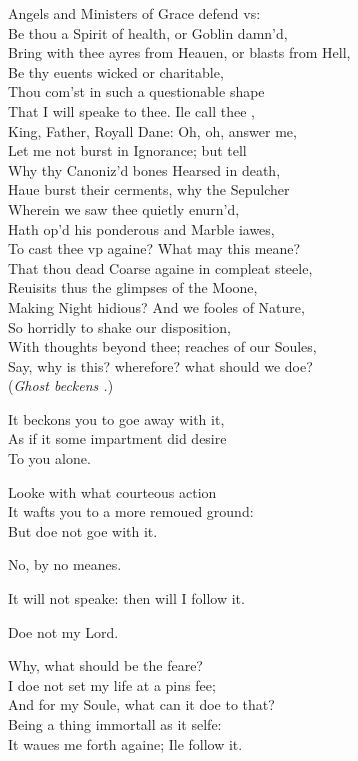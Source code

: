 \documentclass[a5paper,DIV=calc,11pt]{scrbook}
\begin{document}
\begin{drama*}
    \hamspeaks Angels and Ministers of Grace defend vs:\\
    Be thou a Spirit of health, or Goblin damn'd,\\
    Bring with thee ayres from Heauen, or blasts from Hell,\\
    Be thy euents wicked or charitable,\\
    Thou com'st in such a questionable shape\\
    That I will speake to thee. Ile call thee \ham,\\
    King, Father, Royall Dane: Oh, oh, answer me,\\
    Let me not burst in Ignorance; but tell\\
    Why thy Canoniz'd bones Hearsed in death,\\
    Haue burst their cerments, why the Sepulcher\\
    Wherein we saw thee quietly enurn'd,\\
    Hath op'd his ponderous and Marble iawes,\\
    To cast thee vp againe? What may this meane?\\
    That thou dead Coarse againe in compleat steele,\\
    Reuisits thus the glimpses of the Moone,\\
    Making Night hidious? And we fooles of Nature,\\
    So horridly to shake our disposition,\\
    With thoughts beyond thee; reaches of our Soules,\\
    Say, why is this? wherefore? what should we doe?\\
    (\textit{Ghost beckens \ham.})
    
    \horspeaks It beckons you to goe away with it,\\
    As if it some impartment did desire\\
    To you alone.
    
    \marspeaks Looke with what courteous action\\
    It wafts you to a more remoued ground:\\
    But doe not goe with it.
    
    \horspeaks No, by no meanes.
    
    \hamspeaks It will not speake: then will I follow it.
    
    \horspeaks Doe not my Lord.
    
    \hamspeaks Why, what should be the feare?\\
    I doe not set my life at a pins fee;\\
    And for my Soule, what can it doe to that?\\
    Being a thing immortall as it selfe:\\
    It waues me forth againe; Ile follow it.
    

\end{drama*}
\end{document}
